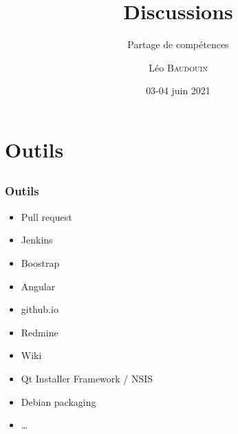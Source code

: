 \documentclass{beamer}
\title{Discussions}
\subtitle{Partage de compétences}
\author{L\'eo \textsc{Baudouin}}
\institute{
  {\url{baudouin.leo @ gmail.com}}
}
\date{03-04 juin 2021}
\begin{document}
\begin{frame}
  \titlepage
\end{frame}




\section{Outils}
\subsection{}

\begin{frame}
  \frametitle{Outils}
  \begin{block}{}
  \begin{itemize}[<+->]
  \item Pull request
  \item Jenkins
  \item Boostrap
  \item Angular
  \item github.io
  \item Redmine
  \item Wiki
  \item Qt Installer Framework / NSIS
  \item Debian packaging
  \item \dots
  \end{itemize}
  \end{block}  
\end{frame}

\end{document}
